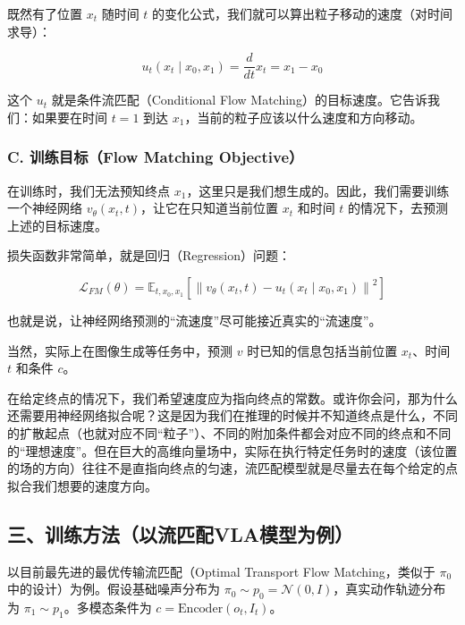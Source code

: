 既然有了位置 \(x_t\) 随时间 \(t\) 的变化公式，我们就可以算出粒子移动的速度（对时间求导）：

\[
u_t(x_t\mid x_0,x_1)=\frac{d}{dt}x_t=x_1-x_0
\]

这个 \(u_t\) 就是条件流匹配（Conditional Flow Matching）的目标速度。它告诉我们：如果要在时间 \(t=1\) 到达 \(x_1\)，当前的粒子应该以什么速度和方向移动。

\hypertarget{c.-ux8badux7ec3ux76eeux6807flow-matching-objective}{%
\subsubsection{C. 训练目标（Flow Matching Objective）}\label{c.-ux8badux7ec3ux76eeux6807flow-matching-objective}}

在训练时，我们无法预知终点 \(x_1\)，这里只是我们想生成的。因此，我们需要训练一个神经网络 \(v_\theta(x_t,t)\)，让它在只知道当前位置 \(x_t\) 和时间 \(t\) 的情况下，去预测上述的目标速度。

损失函数非常简单，就是回归（Regression）问题：

\[
\mathcal{L}_{FM}(\theta)=\mathbb{E}_{t,x_0,x_1}\left[\left\|v_\theta(x_t,t)-u_t(x_t\mid x_0,x_1)\right\|^2\right]
\]

也就是说，让神经网络预测的``流速度''尽可能接近真实的``流速度''。

当然，实际上在图像生成等任务中，预测 \(v\) 时已知的信息包括当前位置 \(x_t\)、时间 \(t\) 和条件 \(c\)。

在给定终点的情况下，我们希望速度应为指向终点的常数。或许你会问，那为什么还需要用神经网络拟合呢？这是因为我们在推理的时候并不知道终点是什么，不同的扩散起点（也就对应不同``粒子''）、不同的附加条件都会对应不同的终点和不同的``理想速度''。但在巨大的高维向量场中，实际在执行特定任务时的速度（该位置的场的方向）往往不是直指向终点的匀速，流匹配模型就是尽量去在每个给定的点拟合我们想要的速度方向。

\hypertarget{ux4e09ux8badux7ec3ux65b9ux6cd5ux4ee5ux6d41ux5339ux914dvlaux6a21ux578bux4e3aux4f8b}{%
\subsection{三、训练方法（以流匹配VLA模型为例）}\label{ux4e09ux8badux7ec3ux65b9ux6cd5ux4ee5ux6d41ux5339ux914dvlaux6a21ux578bux4e3aux4f8b}}

以目前最先进的最优传输流匹配（Optimal Transport Flow Matching，类似于 \(\pi_0\) 中的设计）为例。假设基础噪声分布为 \(\pi_0\sim p_0=\mathcal{N}(0,I)\)，真实动作轨迹分布为 \(\pi_1\sim p_1\)。多模态条件为 \(c=\mathrm{Encoder}(o_t,I_t)\)。

